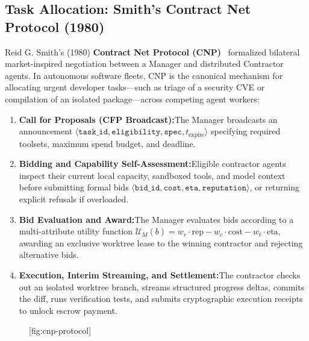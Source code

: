 \subsection{Task Allocation: Smith's Contract Net Protocol (1980)}

Reid G. Smith's (1980) \textbf{Contract Net Protocol (CNP)}~ formalized bilateral market-inspired negotiation between a Manager and distributed Contractor agents. In autonomous software fleets, CNP is the canonical mechanism for allocating urgent developer tasks---such as triage of a security CVE or compilation of an isolated package---across competing agent workers:

\begin{enumerate}[leftmargin=1.8em,itemsep=2pt]
  \item \textbf{Call for Proposals (CFP Broadcast):}\enspace The Manager broadcasts an announcement $\langle\mathtt{task\_id}, \allowbreak \mathtt{eligibility}, \allowbreak \mathtt{spec}, \allowbreak t_{\text{expire}}\rangle$ specifying required toolsets, maximum spend budget, and deadline.
  \item \textbf{Bidding and Capability Self-Assessment:}\enspace Eligible contractor agents inspect their current local capacity, sandboxed tools, and model context before submitting formal bids $\langle\mathtt{bid\_id}, \allowbreak \mathtt{cost}, \allowbreak \mathtt{eta}, \allowbreak \mathtt{reputation}\rangle$, or returning explicit refusals if overloaded.
  \item \textbf{Bid Evaluation and Award:}\enspace The Manager evaluates bids according to a multi-attribute utility function $\mathcal{U}_M(b) = w_r \cdot \text{rep} - w_c \cdot \text{cost} - w_t \cdot \text{eta}$, awarding an exclusive worktree lease to the winning contractor and rejecting alternative bids.
  \item \textbf{Execution, Interim Streaming, and Settlement:}\enspace The contractor checks out an isolated worktree branch, streams structured progress deltas, commits the diff, runs verification tests, and submits cryptographic execution receipts to unlock escrow payment.
\end{enumerate}

\begin{figure}[tp]
  \centering
  [fig:cnp-protocol]
\end{figure}


